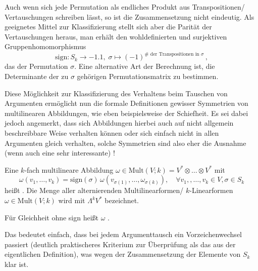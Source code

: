 \documentclass[../H_Analysis_main.tex]{subfiles}
\begin{document}
Auch wenn sich jede Permutation als endliches Produkt aus Transpositionen/ Vertauschungen schreiben lässt, so ist die Zusammensetzung nicht eindeutig. Als geeignetes Mittel zur Klassifizierung stellt sich aber die Parität der Vertauschungen heraus, man erhält den wohldefinierten und surjektiven Gruppenhomomorphismus
\begin{equation}
\text{sign}: S_k \rightarrow \qty{-1, 1}, \; \sigma \mapsto (-1)^{\# \text{ der Transpositionen in } \sigma} \, ,
\end{equation}
das  der Permutation $\sigma$. Eine alternative Art der Berechnung ist, die Determinante der zu $\sigma$ gehörigen Permutationsmatrix zu bestimmen.


Diese Möglichkeit zur Klassifizierung des Verhaltens beim Tauschen von Argumenten ermöglicht nun die formale Definitionen gewisser Symmetrien von multilinearen Abbildungen, wie eben beispielsweise der Schiefheit. Es sei dabei jedoch angemerkt, dass sich Abbildungen hierbei auch auf nicht allgemein beschreibbare Weise verhalten können oder sich einfach nicht in allen Argumenten gleich verhalten, solche Symmetrien sind also eher die Ausnahme (wenn auch eine sehr interessante) !

\begin{defi}
Eine $k$-fach multilineare Abbildung $\omega \in \text{Mult}(V; k) = V^* \otimes \dots \otimes V^*$ mit
\begin{equation}
\omega(v_1, \dots, v_k) = \text{sign}(\sigma) \, \omega(v_{\sigma(1)}, \dots, \omega_{\sigma(k)}), \quad \forall v_1, ,\dots, v_k \in V, \sigma \in S_k
\end{equation}
heißt . Die Menge aller alternierenden Multilinearformen/ $k$-Linearformen $\omega \in \text{Mult}(V; k)$ wird mit $\Lambda^k V^*$ bezeichnet.

Für Gleichheit ohne sign heißt $\omega$ .
\end{defi}

Das bedeutet einfach, dass bei jedem Argumenttausch ein Vorzeichenwechsel passiert (deutlich praktischeres Kriterium zur Überprüfung als das aus der eigentlichen Definition), was wegen der Zusammensetzung der Elemente von $S_k$ klar ist.
\end{document}
